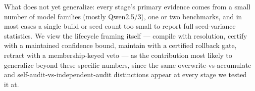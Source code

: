 What does not yet generalize: every stage's primary evidence comes from a small number of model families (mostly Qwen2.5/3), one or two benchmarks, and in most cases a single build or seed count too small to report full seed-variance statistics. We view the lifecycle framing itself --- compile with resolution, certify with a maintained confidence bound, maintain with a certified rollback gate, retract with a membership-keyed veto --- as the contribution most likely to generalize beyond these specific numbers, since the same overwrite-vs-accumulate and self-audit-vs-independent-audit distinctions appear at every stage we tested it at.
